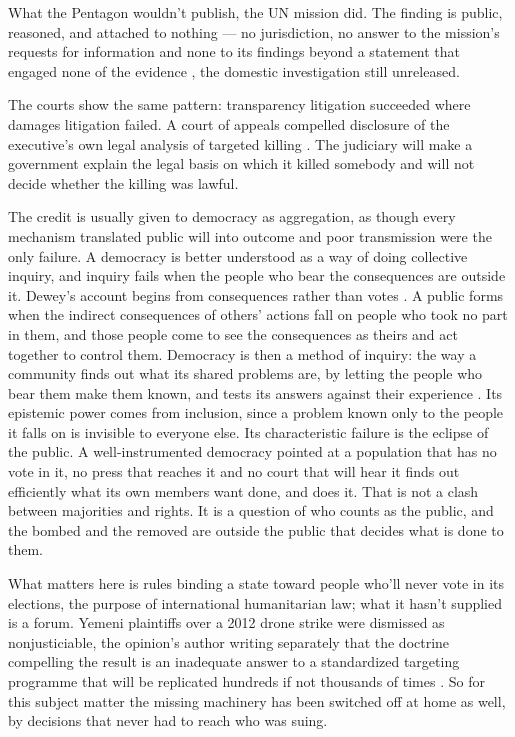 What the Pentagon wouldn't publish, the UN mission did. The finding is public, reasoned, and attached to nothing — no jurisdiction, no answer to the mission's requests for information \autocite[para.~97]{UNFFMIran2026} and none to its findings beyond a statement that engaged none of the evidence \autocite{rferl2026whitehouseun}, the domestic investigation still unreleased.

The courts show the same pattern: transparency litigation succeeded where damages litigation failed. A court of appeals compelled disclosure of the executive's own legal analysis of targeted killing \autocite{nytimes2014olc}. The judiciary will make a government explain the legal basis on which it killed somebody and will not decide whether the killing was lawful.


The credit is usually given to democracy as aggregation, as though every mechanism translated public will into outcome and poor transmission were the only failure. A democracy is better understood as a way of doing collective inquiry, and inquiry fails when the people who bear the consequences are outside it. Dewey's account begins from consequences rather than votes \autocite{dewey1927public}. A public forms when the indirect consequences of others' actions fall on people who took no part in them, and those people come to see the consequences as theirs and act together to control them. Democracy is then a method of inquiry: the way a community finds out what its shared problems are, by letting the people who bear them make them known, and tests its answers against their experience \autocite{anderson2006epistemology}. Its epistemic power comes from inclusion, since a problem known only to the people it falls on is invisible to everyone else. Its characteristic failure is the eclipse of the public. A well-instrumented democracy pointed at a population that has no vote in it, no press that reaches it and no court that will hear it finds out efficiently what its own members want done, and does it. That is not a clash between majorities and rights. It is a question of who counts as the public, and the bombed and the removed are outside the public that decides what is done to them.

What matters here is rules binding a state toward people who'll never vote in its elections, the purpose of international humanitarian law; what it hasn't supplied is a forum. Yemeni plaintiffs over a 2012 drone strike were dismissed as nonjusticiable, the opinion's author writing separately that the doctrine compelling the result is an inadequate answer to a standardized targeting programme that will be replicated hundreds if not thousands of times \autocite{binalijaber2017}. So for this subject matter the missing machinery has been switched off at home as well, by decisions that never had to reach who was suing.

